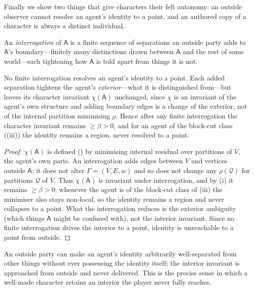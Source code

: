 \documentclass[11pt,twocolumn,a4paper]{article}
\newcommand{\Agent}{\mathsf{A}}
\newcommand{\Self}{\Gamma}          %
\newcommand{\V}{V}
\newcommand{\E}{E}
\newcommand{\wt}{w}
\newcommand{\floorc}{\beta}          %
\newcommand{\Char}{\chi}             %
\begin{document}
Finally we show two things that give characters their felt autonomy: an
outside observer cannot resolve an agent's identity to a point, and an
authored copy of a character is always a distinct individual.

\begin{definition}[Interrogation]
\label{def:interrogation}
An \emph{interrogation} of $\Agent$ is a finite sequence of separations an
outside party adds to $\Agent$'s boundary---finitely many distinctions
drawn between $\Agent$ and the rest of some world---each tightening how
$\Agent$ is told apart from things it is not.
\end{definition}

\begin{theorem}
\label{thm:unreachable}
No finite interrogation resolves an agent's identity to a point. Each
added separation tightens the agent's \emph{exterior}---what it is
distinguished from---but leaves its character invariant $\Char(\Agent)$
unchanged, since $\Char$ is an invariant of the agent's own structure and
adding boundary edges is a change of the exterior, not of the internal
partition minimising $\rho$. Hence after any finite interrogation the
character invariant remains $\ge\floorc>0$, and for an agent of the
block-cut class ((iii)) the identity remains a region,
never resolved to a point.
\end{theorem}

\begin{proof}
$\Char(\Agent)$ is defined () by minimising internal
residual over partitions of $\V$, the agent's own parts. An interrogation
adds edges between $\V$ and vertices outside $\Agent$; it does not alter
$\Self=(\V,\E,\wt)$ and so does not change any $\rho(\mathcal Q)$ for
partitions $\mathcal Q$ of $\V$. Thus $\Char(\Agent)$ is invariant under
interrogation, and by (i) it remains $\ge\floorc>0$;
whenever the agent is of the block-cut class of (iii)
the minimiser also stays non-local, so the identity remains a region and
never collapses to a point. What the interrogation reduces is
the exterior ambiguity (which things $\Agent$ might be confused with), not
the interior invariant. Since no finite interrogation drives the interior
to a point, identity is unreachable to a point from outside.
\end{proof}

\begin{corollary}
An outside party can make an agent's identity arbitrarily well-separated
from other things without ever possessing the identity itself; the
interior invariant is approached from outside and never delivered. This is
the precise sense in which a well-made character retains an interior the
player never fully reaches.
\end{corollary}
\end{document}
